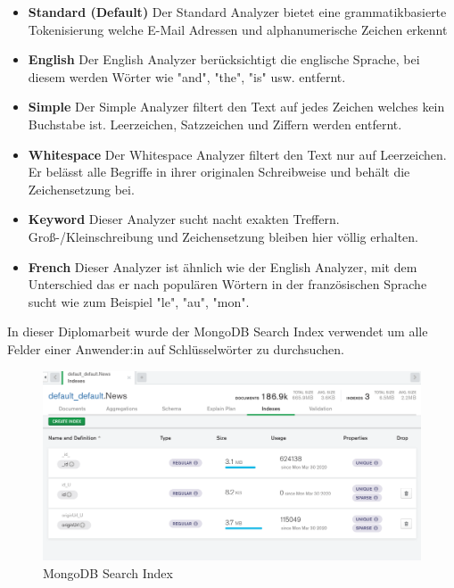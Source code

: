 \begin{itemize}
    \item \textbf{Standard (Default)}
        \newline
        Der Standard Analyzer bietet eine grammatikbasierte Tokenisierung welche E-Mail Adressen und alphanumerische Zeichen erkennt
    \item \textbf{English}
        \newline
        Der English Analyzer berücksichtigt die englische Sprache, bei diesem werden Wörter wie "and", "the", "is" usw. entfernt.
    \item \textbf{Simple}
        \newline
        Der Simple Analyzer filtert den Text auf jedes Zeichen welches kein Buchstabe ist. Leerzeichen, Satzzeichen und Ziffern werden entfernt.
    \item \textbf{Whitespace}
        \newline
        Der Whitespace Analyzer filtert den Text nur auf Leerzeichen. Er belässt alle Begriffe in ihrer originalen Schreibweise und behält die Zeichensetzung bei.
    \item \textbf{Keyword}
        \newline
        Dieser Analyzer sucht nacht exakten Treffern. Groß-/Kleinschreibung und Zeichensetzung bleiben hier völlig erhalten.
    \item \textbf{French}
        \newline
        Dieser Analyzer ist ähnlich wie der English Analyzer, mit dem Unterschied das er nach populären Wörtern in der französischen Sprache sucht wie zum Beispiel "le", "au", "mon".
\end{itemize}

In dieser Diplomarbeit wurde der MongoDB Search Index verwendet um alle Felder einer Anwender:in auf Schlüsselwörter zu durchsuchen.
\cite{Search_Indexes}
\cite{Atlas_Indexes}

\begin{figure}[h!]
    \centering
    \includegraphics[width=0.7\linewidth]{pics/mongodb-search-indizes.png}
    \caption{MongoDB Search Index}
    \label{fig:enter-label}
\end{figure}




